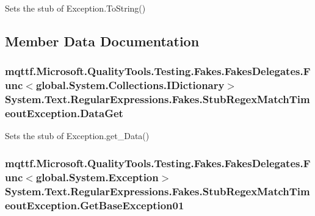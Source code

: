 Sets the stub of Exception.\-To\-String()



\subsection{Member Data Documentation}
\hypertarget{class_system_1_1_text_1_1_regular_expressions_1_1_fakes_1_1_stub_regex_match_timeout_exception_a65e002bc0f27f819a121cc22e7bfb5f6}{
\subsubsection[{Data\-Get}]{\setlength{\rightskip}{0pt plus 5cm}mqttf.\-Microsoft.\-Quality\-Tools.\-Testing.\-Fakes.\-Fakes\-Delegates.\-Func$<$global.\-System.\-Collections.\-I\-Dictionary$>$ System.\-Text.\-Regular\-Expressions.\-Fakes.\-Stub\-Regex\-Match\-Timeout\-Exception.\-Data\-Get}}\label{class_system_1_1_text_1_1_regular_expressions_1_1_fakes_1_1_stub_regex_match_timeout_exception_a65e002bc0f27f819a121cc22e7bfb5f6}


Sets the stub of Exception.\-get\-\_\-\-Data()

\hypertarget{class_system_1_1_text_1_1_regular_expressions_1_1_fakes_1_1_stub_regex_match_timeout_exception_a0af5a77b777763ff5bd1eca4aedc9f00}{
\subsubsection[{Get\-Base\-Exception01}]{\setlength{\rightskip}{0pt plus 5cm}mqttf.\-Microsoft.\-Quality\-Tools.\-Testing.\-Fakes.\-Fakes\-Delegates.\-Func$<$global.\-System.\-Exception$>$ System.\-Text.\-Regular\-Expressions.\-Fakes.\-Stub\-Regex\-Match\-Timeout\-Exception.\-Get\-Base\-Exception01}}\label{class_system_1_1_text_1_1_regular_expressions_1_1_fakes_1_1_stub_regex_match_timeout_exception_a0af5a77b777763ff5bd1eca4aedc9f00}


